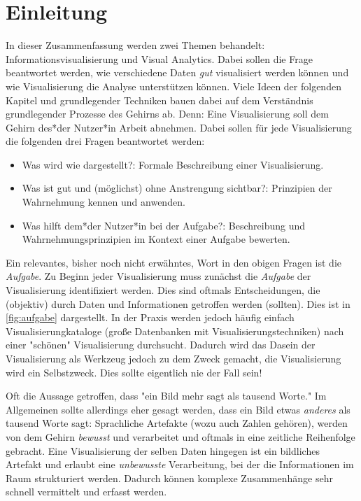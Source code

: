 
\chapter{Einleitung}
    In dieser Zusammenfassung werden zwei Themen behandelt: Informationsvisualisierung und Visual Analytics. Dabei sollen die Frage beantwortet werden, wie verschiedene Daten \emph{gut} visualisiert werden können und wie Visualisierung die Analyse unterstützen können. Viele Ideen der folgenden Kapitel und grundlegender Techniken bauen dabei auf dem Verständnis grundlegender Prozesse des Gehirns ab. Denn: Eine Visualisierung soll dem Gehirn des*der Nutzer*in Arbeit abnehmen. Dabei sollen für jede Visualisierung die folgenden drei Fragen beantwortet werden:
    \begin{itemize}
    	\item Was wird wie dargestellt?: Formale Beschreibung einer Visualisierung.
    	\item Was ist gut und (möglichst) ohne Anstrengung sichtbar?: Prinzipien der Wahrnehmung kennen und anwenden.
    	\item Was hilft dem*der Nutzer*in bei der Aufgabe?: Beschreibung und Wahrnehmungsprinzipien im Kontext einer Aufgabe bewerten.
    \end{itemize}
	Ein relevantes, bisher noch nicht erwähntes, Wort in den obigen Fragen ist die \emph{Aufgabe}. Zu Beginn jeder Visualisierung muss zunächst die \emph{Aufgabe} der Visualisierung identifiziert werden. Dies sind oftmals Entscheidungen, die (objektiv) durch Daten und Informationen getroffen werden (sollten). Dies ist in \autoref{fig:aufgabe} dargestellt. In der Praxis werden jedoch häufig einfach Visualisierungkataloge (große Datenbanken mit Visualisierungstechniken) nach einer "schönen" Visualisierung durchsucht. Dadurch wird das Dasein der Visualisierung als Werkzeug jedoch zu dem Zweck gemacht, \dh die Visualisierung wird ein Selbstzweck. Dies sollte eigentlich nie der Fall sein!

	Oft die Aussage getroffen, dass "ein Bild mehr sagt als tausend Worte." Im Allgemeinen sollte allerdings eher gesagt werden, dass ein Bild etwas \emph{anderes} als tausend Worte sagt: Sprachliche Artefakte (wozu auch Zahlen gehören), werden von dem Gehirn \emph{bewusst} und verarbeitet und oftmals in eine zeitliche Reihenfolge gebracht. Eine Visualisierung der selben Daten hingegen ist ein bildliches Artefakt und erlaubt eine \emph{unbewusste} Verarbeitung, bei der die Informationen im Raum strukturiert werden. Dadurch können komplexe Zusammenhänge sehr schnell vermittelt und erfasst werden.

